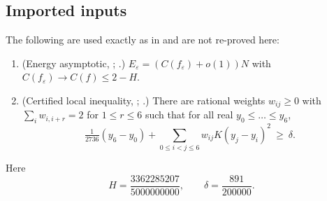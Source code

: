 \documentclass[reqno,11pt]{amsart}
\numberwithin{equation}{section}
\theoremstyle{plain}
\theoremstyle{remark}
\newcommand{\eps}{\varepsilon}
\begin{document}
\subsection*{Imported inputs}
The following are used exactly as in \cite{Kna26} and are not re-proved
here:
\begin{enumerate}
\item (Energy asymptotic, \cite[Lemma 5]{BGST24}; \cite[Prop.~5]{Kna26}.)
$E_\eps=(C(f_\eps)+o(1))N$ with $C(f_\eps)\to C(f)\le 2-H$.
\item (Certified local inequality, \cite{TRM26}; \cite[Prop.~6]{Kna26}.) There
are rational weights $w_{ij}\ge0$ with $\sum_i w_{i,i+r}=2$ for $1\le r\le6$
such that for all real $y_0\le\dots\le y_6$,
\[
\tfrac{1}{2736}(y_6-y_0)+\sum_{0\le i<j\le 6}w_{ij}K(y_j-y_i)^2\ \ge\ \delta.
\]
\end{enumerate}
Here
\begin{equation}\label{eq:imports}
H=\frac{3362285207}{5000000000},\qquad \delta=\frac{891}{200000}.
\end{equation}
\end{document}

